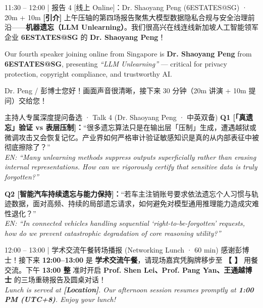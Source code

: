 \documentclass[12pt,a4paper]{article}
\newcommand{\blankline}[1]{%
  \underline{\hspace{#1}}%
}
\begin{document}
\begin{scriptbox}{11:30 – 12:00 \;|\; 报告 4 [线上 Online]：Dr. Shaoyang Peng (6ESTATES@SG) · 20m + 10m}
\fontsize{11.1}{15.8}\selectfont
\textbf{[引介]} 上午压轴的第四场报告聚焦大模型数据隐私合规与安全治理前沿——\textbf{机器遗忘（LLM Unlearning）}。我们很高兴在线连线新加坡人工智能领军企业 \textbf{6ESTATES@SG} 的 \textbf{Dr. Shaoyang Peng}！\par
Our fourth speaker joining online from Singapore is \textbf{Dr. Shaoyang Peng} from \textbf{6ESTATES@SG}, presenting \textit{``LLM Unlearning''} — critical for privacy protection, copyright compliance, and trustworthy AI.\par
Dr. Peng / 彭博士您好！画面声音很清晰，接下来 30 分钟（20m 讲演 + 10m 提问）交给您！
\end{scriptbox}
\begin{qabox}{主持人专属深度提问备选 · Talk 4 (Dr. Shaoyang Peng · 中英双备)}
\fontsize{10}{14.1}\selectfont
\textbf{Q1 [「真遗忘」验证 vs 表层压制]：}“很多遗忘算法只是在输出层「压制」生成，遭遇越狱或微调攻击又会恢复记忆。产业界如何严格审计验证敏感知识是真的从内部表征中被彻底擦除了？” \\
\textit{EN: ``Many unlearning methods suppress outputs superficially rather than erasing internal representations. How can we rigorously certify that sensitive data is truly forgotten?''}\par
\textbf{Q2 [智能汽车持续遗忘与能力保持]：}“若车主注销账号要求依法遗忘个人习惯与轨迹数据，面对高频、持续的局部遗忘请求，如何避免对模型通用推理能力造成灾难性退化？” \\
\textit{EN: ``In connected vehicles handling sequential `right-to-be-forgotten' requests, how do we prevent catastrophic degradation of core reasoning utility?''}
\end{qabox}

\begin{transbox}{12:00 – 13:00 \;|\; 学术交流午餐转场播报 (Networking Lunch · 60 min)}
\fontsize{10.6}{14.8}\selectfont
感谢彭博士！接下来 \textbf{12:00–13:00} 是 \textbf{学术交流午餐}，请现场嘉宾凭胸牌移步至 \textbf{【\blankline{42mm}】} 用餐交流。下午 \textbf{13:00 整} 准时开启 \textbf{Prof. Shen Lei、Prof. Pang Yan、王通越博士} 的三场重磅报告及圆桌对话！\\
\textit{Lunch is served at \textbf{[Location]}. Our afternoon session resumes promptly at \textbf{1:00 PM (UTC+8)}. Enjoy your lunch!}
\end{transbox}

\newpage
\end{document}
